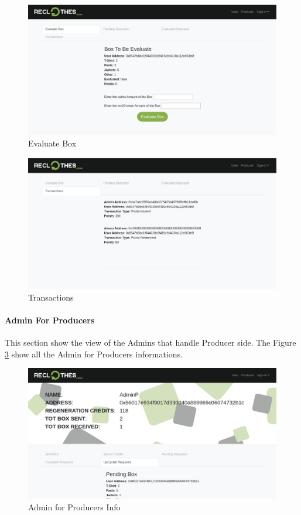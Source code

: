 \begin{figure}[h!]
    \centering
    \includegraphics[totalheight=7.5cm]{img/dapp/admin-evaluate.png}
    \caption{Evaluate Box}
    \label{fig:evaluate_box}
\end{figure}

\begin{figure}[h!]
    \centering
    \includegraphics[totalheight=7.5cm]{img/dapp/admin-tx.png}
    \caption{Transactions}
    \label{fig:admin-tx}
\end{figure}

\paragraph{Admin For Producers}

This section show the view of the Admins that handle Producer side. The Figure \ref{fig:adminp-info} 
show all the Admin for Producers informations. 

\begin{figure}[h!]
    \centering
    \includegraphics[totalheight=7.5cm]{img/dapp/adminp-info.png}
    \caption{Admin for Producers Info}
    \label{fig:adminp-info}
\end{figure}

